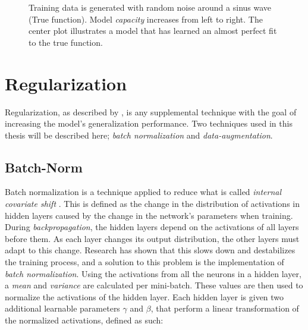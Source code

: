         
        \begin{figure}[H]
            \centering
            
            \caption[Over/under-fit]{Training data is generated with random noise around a sinus wave (True function). Model \textit{capacity} increases from left to right. The center plot illustrates a model that has learned an almost perfect fit to the true function.}
          	\medskip 
            \label{over/under fit fig}
        \end{figure}
        
        
\section{Regularization}
    Regularization, as described by \citeauthor{kukavcka2017_regularization} \cite{kukavcka2017_regularization}, is any supplemental technique with the goal of increasing the model's generalization performance. Two techniques used in this thesis will be described here; \textit{batch normalization} and \textit{data-augmentation}.
    
\subsection{Batch-Norm}
    Batch normalization is a technique applied to reduce what is called \textit{internal covariate shift} \cite{pmlr-v37-ioffe15_batch_norm}. This is defined as the change in the distribution of activations in hidden layers caused by the change in the network's parameters when training. During \textit{backpropagation}, the hidden layers depend on the activations of all layers before them. As each layer changes its output distribution, the other layers must adapt to this change. Research has shown that this slows down and destabilizes the training process, and a solution to this problem is the implementation of \textit{batch normalization}. Using the activations from all the neurons in a hidden layer, a \textit{mean} and \textit{variance} are calculated per mini-batch. These values are then used to normalize the activations of the hidden layer. Each hidden layer is given two additional learnable parameters $\gamma$ and $\beta$, that perform a linear transformation of the normalized activations, defined as such:
    
